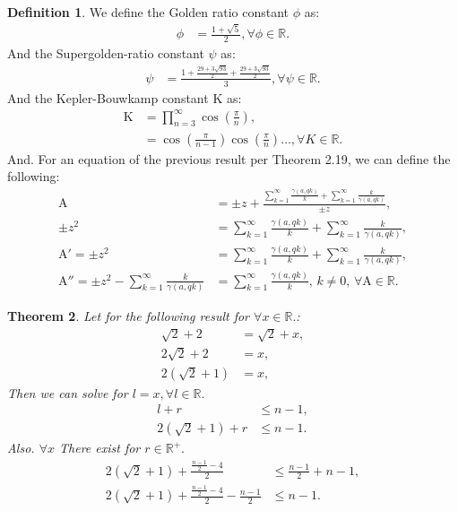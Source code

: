 \documentclass[10pt]{article}
\theoremstyle{plain}
\newtheorem{theorem}{Theorem}[section]
\theoremstyle{definition}
\newtheorem{definition}[theorem]{Definition}
\theoremstyle{remark}
\begin{document}
\begin{definition}
	We define the Golden ratio constant $\phi$ as:
	\begin{align*}
		\phi &= \frac{1+\sqrt{5}}{2}, \forall \phi \in \mathbb{R}.
	\end{align*}
	And the Supergolden-ratio constant $\psi$ as:
	\begin{align*}
		\psi &= \frac{1+\frac{29+3\sqrt{93}}{2}+\frac{29+3\sqrt{93}}{2}}{3}, \forall \psi \in \mathbb{R}.
	\end{align*}
	And the Kepler-Bouwkamp constant $\mathrm{K}$ as:
	\begin{align*}
		\mathrm{K} &= \prod_{n=3}^{\infty} \cos(\frac{\pi}{n}),\\
		&= \cos(\frac{\pi}{n-1}) \cos(\frac{\pi}{n}) \dots, \forall K \in \mathbb{R}.
	\end{align*}
	And. For an equation of the previous result per Theorem 2.19, we can define the following:
	\begin{align*}
		\mathrm{A} &= \pm z + \frac{\sum_{k=1}^{\infty} \frac{\gamma(a, qk)}{k} + \sum_{k=1}^{\infty}\frac{k}{\gamma(a, qk)}}{\pm z},\\
		\pm z^2 &= \sum_{k=1}^{\infty} \frac{\gamma(a, qk)}{k} + \sum_{k=1}^{\infty}\frac{k}{\gamma(a, qk)},\\
		\mathrm{A}' = \pm z^2 &= \sum_{k=1}^{\infty} \frac{\gamma(a, qk)}{k} + \sum_{k=1}^{\infty}\frac{k}{\gamma(a, qk)},\\
		\mathrm{A}'' = \pm z^{2} - \sum_{k=1}^{\infty}\frac{k}{\gamma(a, qk)} &= \sum_{k=1}^{\infty} \frac{\gamma(a, qk)}{k}, \, k \neq 0, \, \forall \mathrm{A} \in \mathbb{R}.
	\end{align*}
\end{definition}

\begin{theorem}
	Let for the following result for $\forall x \in \mathbb{R}.$:
	\begin{align*}
		\sqrt{2}+2&=\sqrt{2} + x,\\
		2\sqrt{2}+2 &=x,\\
		2(\sqrt{2} + 1) &= x,
	\end{align*}
	Then we can solve for $l=x, \forall l \in \mathbb{R}.$
	\begin{align*}
		l + r &\leq n - 1,\\
		2(\sqrt{2} + 1) + r &\leq n - 1.
	\end{align*}
	Also. $\forall x$ There exist for $r \in \mathbb{R}^{+}.$
	\begin{align*}
		2(\sqrt{2} + 1) + \frac{\frac{n - 1}{2} - 4}{2}  &\leq \frac{n - 1}{2} + n - 1,\\
		2(\sqrt{2} + 1) + \frac{\frac{n - 1}{2} - 4}{2} - \frac{n - 1}{2} &\leq n - 1.
	\end{align*}
\end{theorem}
\end{document}
